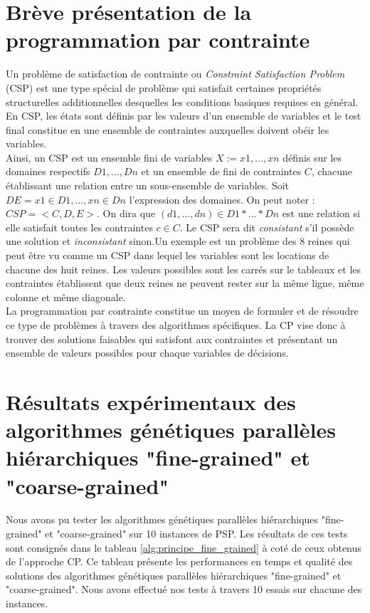 \documentclass[12pt,a4paper]{article}
\begin{document}
	\section{Brève présentation de la programmation par contrainte}	
	Un problème de satisfaction de contrainte ou \emph{Constraint Satisfaction Problem} (CSP) est une type spécial de problème qui satisfait certaines propriétés structurelles additionnelles desquelles les conditions basiques requises en général. En CSP, les états sont définis par les valeurs d'un ensemble de variables et le test final constitue en une ensemble de contraintes auxquelles doivent obéir les variables. \\
	\hspace*{.5cm} Ainsi, un CSP est un ensemble fini de variables $X := x1,...,xn$ définis sur les domaines respectifs $D1,...,Dn$ et un ensemble de fini de contraintes $C$, chacune établissant une relation entre un sous-ensemble de variables. Soit $DE = x1 \in D1,..., xn \in Dn$ l'expression des domaines. On peut noter : $CSP = <C,D,E>$. On dira que $(d1,...,dn) \in D1*...*Dn$ est une relation si elle satisfait toutes les contraintes $c \in C$. Le CSP sera dit \emph{consistant} s'il possède une solution et \emph{inconsistant} sinon.Un exemple est un problème des 8 reines qui peut être vu comme un CSP dans lequel les variables sont les locations de chacune des huit reines. Les valeurs possibles sont les carrés sur le tableaux et les contraintes établissent que deux reines ne peuvent rester sur la même ligne, même colonne et même diagonale. \\
	\hspace*{.5cm} La programmation par contrainte constitue un moyen de formuler et de résoudre ce type de problèmes à travers des algorithmes spécifiques. La CP vise donc à trouver des solutions faisables qui satisfont aux contraintes et présentant un ensemble de valeurs possibles pour chaque variables de décisions.
		
		\section{Résultats expérimentaux des algorithmes génétiques parallèles hiérarchiques "fine-grained" et "coarse-grained"}
		Nous avons pu tester les algorithmes génétiques parallèles hiérarchiques "fine-grained" et "coarse-grained" sur 10 instances de PSP. Les résultats de ces tests sont consignés dans le tableau \ref{alg:principe_fine_grained} à coté de ceux obtenus de l'approche CP. Ce tableau présente les performances en temps et qualité des solutions des algorithmes génétiques parallèles hiérarchiques "fine-grained" et "coarse-grained". Nous avons effectué nos tests à travers 10 essais sur chacune des instances.
		
\end{document}
